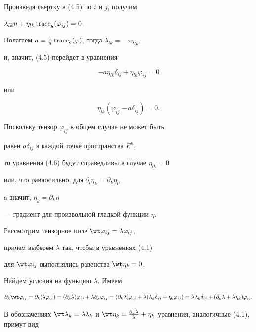 Произведя свертку в (4.5) по $i$ и $j$, получим


$\lambda_{lk} n+\eta_{lk}\operatorname{trace}_g(\varphi_{ij})=0$.


Полагаем $a=\frac{1}{n}\operatorname{trace}_g(\varphi)$, тогда $\lambda_{lk}=-a\eta_{lk}$,


и, значит, (4.5) перейдет в уравнения


$$


-a\eta_{lk}\delta_{ij}+\eta_{lk}\varphi_{ij}=0


$$


или


\begin{equation}


\eta_{lk}(\varphi_{ij}-a\delta_{ij})=0.


\end{equation}


Поскольку тензор $\varphi_{ij}$ в общем случае не может быть 


равен $a\delta_{ij}$ в каждой точке пространства $E^n$,


то уравнения (4.6) будут справедливы в случае $\eta_{lk}=0$


или, что равносильно, для $\partial_l\eta_k=\partial_k\eta_l$,


a значит, $\eta_k=\partial_k\eta$


--- градиент для произвольной гладкой функции $\eta$.





Рассмотрим тензорное поле $\wt \varphi_{ij}=\lambda\varphi_{ij}$,


причем выберем $\lambda$ так, чтобы в уравнениях (4.1)


для $\wt \varphi_{ij}$ выполнялись равенства $\wt \eta_k=0$.


Найдем условия на функцию $\lambda$. Имеем


$$


\partial_k \wt \varphi_{ij}=\partial_k(\lambda \varphi_{ij})


=(\partial_k\lambda)\varphi_{ij}


+\lambda\partial_k\varphi_{ij}=


(\partial_k\lambda)\varphi_{ij}+\lambda(\lambda_k


\delta_{ij}+\eta_k\varphi_{ij})= 


\lambda\lambda_k\delta_{ij}+(\partial_k\lambda+\lambda\eta_k)\varphi_{ij}.


$$


В обозначениях $\wt \lambda_k=\lambda\lambda_k$ и $\wt \eta_k=\frac{\partial_k


\lambda}{\lambda}+\eta_k$ уравнения, аналогичные (4.1), примут вид



